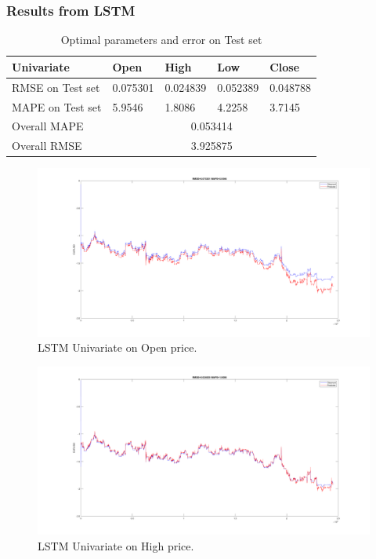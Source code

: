 \documentclass[11pt]{article}
\begin{document}
\subsubsection{Results from LSTM}

\begin{table}[H]
  \centering
\begin{tabular}{|l|l|l|l|l|}
  \hline
  Univariate       & Open        & High       & Low        & Close      \\ \hline
  RMSE on Test set & 0.075301    & 0.024839   & 0.052389   & 0.048788   \\ \hline
  MAPE on Test set & 5.9546      & 1.8086     & 4.2258     & 3.7145     \\ \hline
  Overall MAPE     & \multicolumn{4}{c|}{0.053414}                      \\ \hline
  Overall RMSE     & \multicolumn{4}{c|}{3.925875}                      \\ \hline
\end{tabular}
\caption{Optimal parameters and error on Test set}
\end{table}


\begin{figure}[H]
  \centering
  \includegraphics[width=\textwidth,keepaspectratio]{figs/lstm_uni_open.png}
  \caption{LSTM Univariate on Open price.}
\end{figure}

\begin{figure}[H]
  \centering
  \includegraphics[width=\linewidth,keepaspectratio]{figs/lstm_uni_high.png}
  \caption{LSTM Univariate on High price.}
\end{figure}
\end{document}
